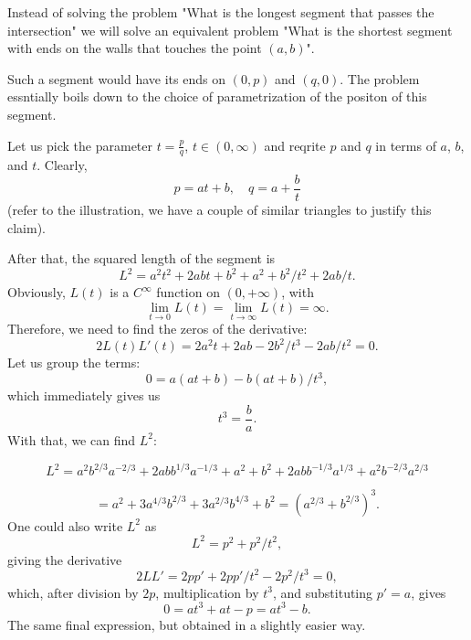\documentclass[12pt, a4paper]{article}
\begin{document}
\noindent
Instead of solving the problem "What is the longest segment that passes the intersection" we will solve an equivalent problem "What is the shortest segment with ends on the walls that touches the point $(a,b)$".


Such a segment would have its ends on $(0,p)$ and $(q,0)$.
The problem essntially boils down to the choice of parametrization of the positon of this segment.

Let us pick the parameter $t=\frac pq$, $t\in(0,\infty)$ and reqrite $p$ and $q$ in terms of $a$, $b$, and $t$.
Clearly,
\[
p = at + b,\quad q = a + \frac bt
\]
(refer to the illustration, we have a couple of similar triangles to justify this claim).

After that, the squared length of the segment is
\[
L^2 = a^2t^2 + 2abt + b^2 + a^2 +b^2/t^2 + 2 ab/t.
\]
Obviously, $L(t)$ is a $C^\infty$ function on $(0,+\infty)$, with
\[
\lim_{t\to 0} L(t) = \lim_{t\to\infty} L(t) =\infty.
\]
Therefore, we need to find the zeros of the derivative:
\[
2L(t)L'(t) = 2 a^2t + 2ab - 2 b^2/t^3 - 2 ab/t^2 = 0.
\]
Let us group the terms:
\[
0 = a(at+b) - b (at + b)/t^3,
\]
which immediately gives us
\[ t^3 = \frac ba.\]
With that, we can find $L^2$:

\[
L^2 = a^2b^{2/3}a^{-2/3} + 2abb^{1/3}a^{-1/3} + a^2 + b^2 + 2abb^{-1/3}a^{1/3} + a^2b^{-2/3}a^{2/3}
\]

\[
= a^2 + 3 a^{4/3}b^{2/3} + 3 a ^{2/3}b^{4/3} + b^2 = \left(a^{2/3}+b^{2/3}\right)^3.
\]
One could also write $L^2$ as 
\[L^2 = p^2 + p^2/t^2,\]
giving the derivative
\[2LL' = 2pp' + 2pp'/t^2 - 2 p^2/t^3 = 0,\]
which, after division by $2p$, multiplication by $t^3$, and substituting $p' = a$, gives
\[0 = at^3 + at - p = at^3-b.\]
The same final expression, but obtained in a slightly easier way.
\end{document}
